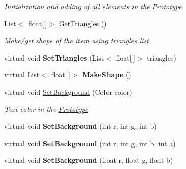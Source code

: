 \begin{DoxyCompactItemize}
\begin{DoxyCompactList}\small\item\em Initialization and adding of all elements in the \mbox{\hyperlink{class_space_v_i_l_1_1_prototype}{Prototype}} \end{DoxyCompactList}\item 
List$<$ float\mbox{[}$\,$\mbox{]}$>$ \mbox{\hyperlink{class_space_v_i_l_1_1_prototype_af033781dfb15abb603274625f90d97de}{Get\+Triangles}} ()
\begin{DoxyCompactList}\small\item\em Make/get shape of the item using triangles list \end{DoxyCompactList}\item 
\mbox{\label{class_space_v_i_l_1_1_prototype_a5373e9f5a6babc04e5106a88e5fcdec0}} 
virtual void {\bfseries Set\+Triangles} (List$<$ float\mbox{[}$\,$\mbox{]}$>$ triangles)
\item 
\mbox{\label{class_space_v_i_l_1_1_prototype_a7e38cb4a418d0d5c0540c7096f4ba7b2}} 
virtual List$<$ float\mbox{[}$\,$\mbox{]}$>$ {\bfseries Make\+Shape} ()
\item 
virtual void \mbox{\hyperlink{class_space_v_i_l_1_1_prototype_aa35761db5812bd6125ab380ad38b9a46}{Set\+Background}} (Color color)
\begin{DoxyCompactList}\small\item\em Text color in the \mbox{\hyperlink{class_space_v_i_l_1_1_prototype}{Prototype}} \end{DoxyCompactList}\item 
\mbox{\label{class_space_v_i_l_1_1_prototype_a7d1149f007bb6d6b00186d7f377116a9}} 
virtual void {\bfseries Set\+Background} (int r, int g, int b)
\item 
\mbox{\label{class_space_v_i_l_1_1_prototype_ab980a997f26e810531835f139241e9af}} 
virtual void {\bfseries Set\+Background} (int r, int g, int b, int a)
\item 
\mbox{\label{class_space_v_i_l_1_1_prototype_a665418547d0f15181b8562b3b568b19a}} 
virtual void {\bfseries Set\+Background} (float r, float g, float b)
\item 
\mbox{\label{class_space_v_i_l_1_1_prototype_a1eac755b90e8249d3ee431e514e0e5de}} 

\end{DoxyCompactItemize}
